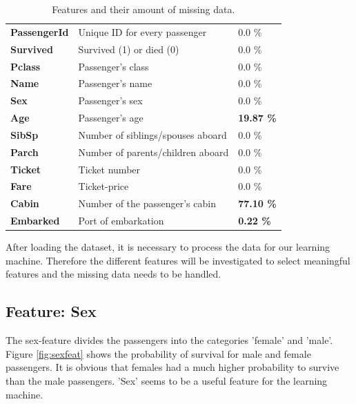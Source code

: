 \begin{table}
\caption{Features and their amount of missing data.}
\begin{tabular}{>{\bfseries}l l l}
PassengerId & Unique ID for every passenger & 0.0 \%\\
Survived & Survived (1) or died (0) & 0.0 \% \\
Pclass & Passenger's class & 0.0 \% \\
Name & Passenger's name & 0.0 \% \\
Sex & Passenger's sex & 0.0 \% \\
Age & Passenger's age & \textbf{19.87 \%} \\
SibSp & Number of siblings/spouses aboard & 0.0 \% \\
Parch & Number of parents/children aboard & 0.0 \% \\
Ticket & Ticket number & 0.0 \% \\
Fare & Ticket-price & 0.0 \% \\
Cabin & Number of the passenger's cabin & \textbf{77.10 \%} \\
Embarked & Port of embarkation & \textbf{0.22 \%} \\
\end{tabular}
\centering
\label{tab:features}
\end{table}

After loading the dataset, it is necessary to process the data for our learning machine. Therefore the different features will be investigated to select meaningful features and the missing data needs to be handled.

\subsection{Feature: Sex}
The sex-feature divides the passengers into the categories 'female' and 'male'. Figure \ref{fig:sexfeat} shows the probability of survival for male and female passengers. It is obvious that females had a much higher probability to survive than the male passengers. 'Sex' seems to be a useful feature for the learning machine.

